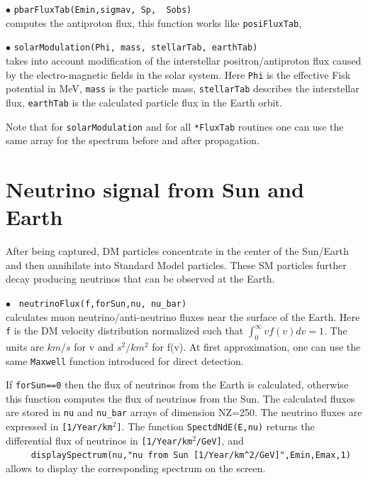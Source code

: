 \documentclass[12pt,a4paper]{article}
\begin{document}
\noindent
$\bullet$ \verb|pbarFluxTab(Emin,sigmav, Sp,  Sobs)|\\
computes the antiproton flux, this function works like \verb|posiFluxTab|,

\noindent
$\bullet$ \verb|solarModulation(Phi, mass, stellarTab, earthTab)|\\
takes into account modification of the interstellar positron/antiproton flux 
caused by the electro-magnetic fields in the solar system. Here \verb|Phi| is the
effective Fisk potential in MeV, \verb|mass| is the particle mass,
\verb|stellarTab| describes the interstellar flux, \verb|earthTab| 
is the calculated particle flux in the Earth orbit.

Note that for \verb|solarModulation| and for  all \verb|*FluxTab| 
routines one can use  the same array for the spectrum before and after propagation. 

\section{ Neutrino signal from Sun and Earth}
\label{sec:neutrino}

After being captured, DM particles concentrate in the center of the Sun/Earth and 
then  annihilate into Standard Model particles. These SM particles further decay producing neutrinos that can be 
observed at the Earth.   

\noindent
$\bullet$ \verb| neutrinoFlux(f,forSun,nu, nu_bar)|\\
calculates muon neutrino/anti-neutrino  fluxes  near the surface of the Earth. 
Here  \verb|f|  is  the DM velocity distribution   normalized such that 
$ \int_0^{\infty} v f(v) dv =1$. The units  are $km/s$ for v and $s^2/km^2$ for  
f(v). At first approximation,   one can use the same  \verb|Maxwell| 
function introduced for direct detection.
  
  If {\tt forSun==0} then the flux of neutrinos from the Earth is calculated, otherwise this function computes the flux of neutrinos from the Sun.  The calculated fluxes are stored in {\tt nu} and {\tt nu\_bar}  arrays of dimension NZ=250.  
The neutrino fluxes are expressed in \verb|[1/Year/km|$^2$\verb|]|.
 The function
{\tt SpectdNdE(E,nu)} returns the differential flux of neutrinos in 
\verb|[1/Year/km|$^2$\verb|/GeV]|, and \\
\verb|     displaySpectrum(nu,"nu from Sun [1/Year/km^2/GeV]",Emin,Emax,1)|\\
allows to display the corresponding spectrum on the screen.    
\end{document}
